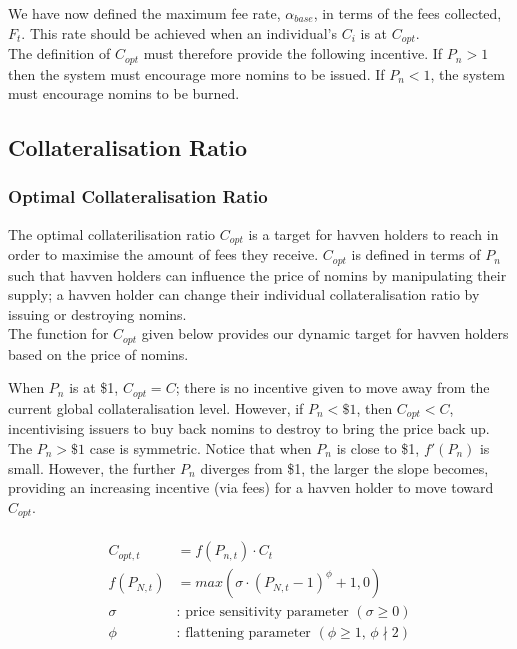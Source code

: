 \noindent We have now defined the maximum fee rate, $\alpha_{base}$, in terms of the fees collected, $F_t$. This rate should be achieved when an individual's $C_i$ is at $C_{opt}$. \\

\noindent The definition of $C_{opt}$ must therefore provide the following incentive. If $P_n > 1$ then the system must encourage more nomins to be issued. If $P_n < 1$, the system must encourage nomins to be burned. 

\newpage

\subsection{Collateralisation Ratio}
\subsubsection{Optimal Collateralisation Ratio}

\noindent The optimal collaterilisation ratio $C_{opt}$ is a target for havven
holders to reach in order to maximise the amount of fees they receive.
$C_{opt}$ is defined in terms of $P_n$ such that havven holders can
influence the price of nomins by manipulating their supply; a havven
holder can change their individual collateralisation ratio by
issuing or destroying nomins. \\
 
\noindent The function for $C_{opt}$ given below provides our dynamic target
for havven holders based on the price of nomins.

\noindent When $P_n$ is at \$1, $C_{opt} = C$; there is no incentive given
to move away from the current global collateralisation level. However, if
$P_n < \$1$, then $C_{opt} < C$, incentivising issuers to buy back nomins
to destroy to bring the price back up. The $P_n > \$1$ case is symmetric.
Notice that when $P_n$ is close to \$1, $ f'(P_n) $ is small.
However, the further $P_n$ diverges from \$1, the larger the slope becomes,
providing an increasing incentive (via fees) for a havven holder to move toward $C_{opt}$.

\begin{gather} 
\begin{align}
\begin{split}
C_{opt,t} &= f(P_{n,t}) \cdot C_t  \\ 
f(P_{N,t}) &= max(\sigma \cdot (P_{N,t} - 1)^{\phi} + 1, 0) \\
\sigma & \text{: price sensitivity parameter } (\sigma \geq 0)\\
\phi   & \text{: flattening parameter } (\phi \geq 1 \text{, } \phi \nmid 2) \\
\end{split}
\end{align}
\end{gather}


